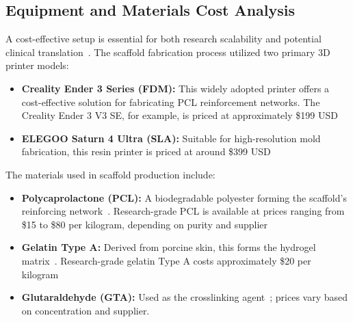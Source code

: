 \subsection{Equipment and Materials Cost Analysis}

A cost-effective setup is essential for both research scalability and potential clinical translation~\cite{woodruff2010returnforgotten}. The scaffold fabrication process utilized two primary 3D printer models:

\begin{itemize}
    \item \textbf{Creality Ender 3 Series (FDM):} This widely adopted printer offers a cost-effective solution for fabricating PCL reinforcement networks. The Creality Ender 3 V3 SE, for example, is priced at approximately \$199 USD
    
    \item \textbf{ELEGOO Saturn 4 Ultra (SLA):} Suitable for high-resolution mold fabrication, this resin printer is priced at around \$399 USD
\end{itemize}

The materials used in scaffold production include:

\begin{itemize}
    \item \textbf{Polycaprolactone (PCL):} A biodegradable polyester forming the scaffold's reinforcing network~\cite{pitt1981aliphaticpolyesters}. Research-grade PCL is available at prices ranging from \$15 to \$80 per kilogram, depending on purity and supplier
    
    \item \textbf{Gelatin Type A:} Derived from porcine skin, this forms the hydrogel matrix~\cite{ahmed2015hydrogelpreparation}. Research-grade gelatin Type A costs approximately \$20 per kilogram
    
    \item \textbf{Glutaraldehyde (GTA):} Used as the crosslinking agent~\cite{sung1999evaluationgelatin}; prices vary based on concentration and supplier.
\end{itemize}

